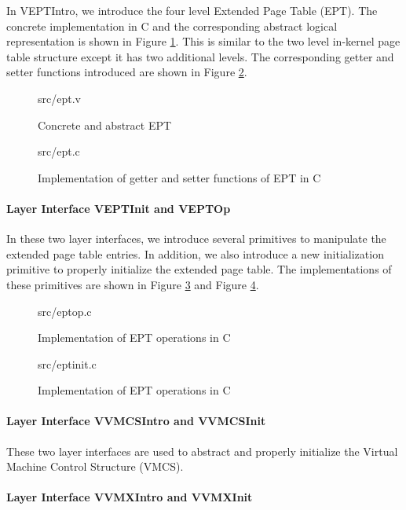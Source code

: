 In VEPTIntro, we introduce the four level Extended Page Table (EPT). The concrete implementation in C
and the corresponding abstract logical representation is shown in Figure \ref{fig:ept_v}.
This is similar to the two level in-kernel page table structure except it has two additional levels.
The corresponding getter and setter functions introduced are shown in Figure \ref{fig:ept_c}.

\begin{figure}
	 {src/ept.v}
	\caption{Concrete and abstract EPT}
	\label{fig:ept_v}
\end{figure}

\begin{figure}
	 {src/ept.c}
	\caption{Implementation of getter and setter functions of EPT in C}
	\label{fig:ept_c}
\end{figure}

\paragraph{Layer Interface VEPTInit and VEPTOp}

In these two layer interfaces, we introduce several primitives to manipulate the extended page table entries.
In addition, we also introduce a new initialization primitive to properly initialize the extended page
table. The implementations of these primitives are shown in Figure \ref{fig:eptop_c} and
Figure \ref{fig:eptinit_c}.

\begin{figure}
	 {src/eptop.c}
	\caption{Implementation of EPT operations in C}
	\label{fig:eptop_c}
\end{figure}

\begin{figure}
	 {src/eptinit.c}
	\caption{Implementation of EPT operations in C}
	\label{fig:eptinit_c}
\end{figure}

\paragraph{Layer Interface VVMCSIntro and VVMCSInit}

These two layer interfaces are used to abstract and properly initialize the Virtual Machine Control Structure (VMCS).

\paragraph{Layer Interface VVMXIntro and VVMXInit}

